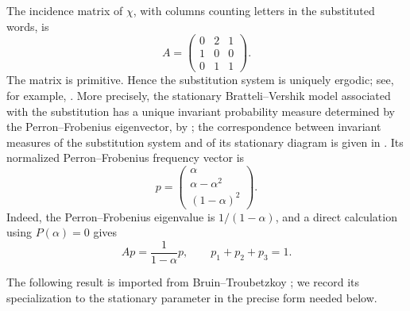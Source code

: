 \documentclass[11pt]{amsart}
\theoremstyle{plain}
\theoremstyle{definition}
\theoremstyle{remark}
\begin{document}
The incidence matrix of \(\chi\), with columns counting letters in the substituted words, is
\[
A=
\begin{pmatrix}
0&2&1\\
1&0&0\\
0&1&1
\end{pmatrix}.
\tag{8.3}
\label{eq:BT-matrix}
\]
The matrix is primitive. Hence the substitution system is uniquely ergodic; see, for
example, \cite{Queffelec2010}. More precisely, the stationary Bratteli--Vershik model
associated with the substitution has a unique invariant probability measure determined by
the Perron--Frobenius eigenvector, by
\cite[Theorem~3.8 and Remark~3.9(1),(2)]{BezuglyiKwiatkowskiMedynetsSolomyak2010};
the correspondence between invariant measures of the substitution system and of its
stationary diagram is given in
\cite[Theorem~5.4]{BezuglyiKwiatkowskiMedynetsSolomyak2010}. Its normalized
Perron--Frobenius frequency vector is
\[
        p=
        \begin{pmatrix}
        \alpha\\
        \alpha-\alpha^2\\
        (1-\alpha)^2
        \end{pmatrix}.
\tag{8.4}
\label{eq:BT-frequency}
\]
Indeed, the Perron--Frobenius eigenvalue is \(1/(1-\alpha)\), and a direct calculation using
\(P(\alpha)=0\) gives
\[
        Ap=\frac{1}{1-\alpha}p,
        \qquad
        p_1+p_2+p_3=1.
\]

The following result is imported from Bruin--Troubetzkoy
\cite[Theorem~7 and its proof, pp.~130 and 135]{BruinTroubetzkoy2003}; we record its
specialization to the stationary parameter in the precise form needed below.
\end{document}
